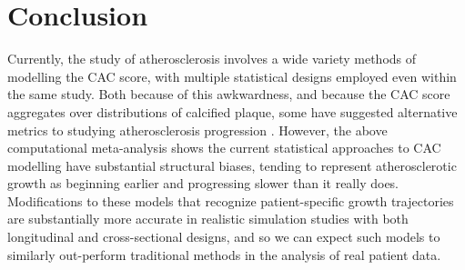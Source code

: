 \documentclass[a4paper, 10pt]{article}
\begin{document}
\section{Conclusion}

Currently, the study of atherosclerosis involves a wide variety methods of modelling the CAC score, with multiple statistical designs employed even within the same study. Both because of this awkwardness, and because the CAC score aggregates over distributions of calcified plaque, some have suggested alternative metrics to studying atherosclerosis progression \cite{berman2016beyond, blaha2016improving}. However, the above computational meta-analysis shows the current statistical approaches to CAC modelling have substantial structural biases, tending to represent atherosclerotic growth as beginning earlier and progressing slower than it really does. Modifications to these models that recognize patient-specific growth trajectories are substantially more accurate in realistic simulation studies with both longitudinal and cross-sectional designs, and so we can expect such models to similarly out-perform traditional methods in the analysis of real patient data.
\end{document}
